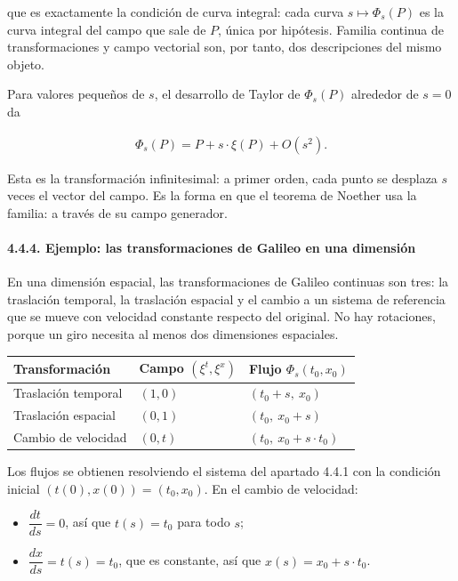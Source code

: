 \documentclass[
  spanish,
]{article}
\newcounter{none} %
\providecommand{\tightlist}{%
  \setlength{\itemsep}{0pt}\setlength{\parskip}{0pt}}
\begin{document}
que es exactamente la condición de curva integral: cada curva
\(s \mapsto \Phi_s(P)\) es la curva integral del campo que sale de
\(P\), única por hipótesis. Familia continua de transformaciones y campo
vectorial son, por tanto, dos descripciones del mismo objeto.

Para valores pequeños de \(s\), el desarrollo de Taylor de \(\Phi_s(P)\)
alrededor de \(s = 0\) da

\[
\begin{aligned}
\Phi_s(P) = P + s \cdot \xi(P) + O(s^2).
\end{aligned}
\]

Esta es la transformación infinitesimal: a primer orden, cada punto se
desplaza \(s\) veces el vector del campo. Es la forma en que el teorema
de Noether usa la familia: a través de su campo generador.

\paragraph{4.4.4. Ejemplo: las transformaciones de Galileo en una
dimensión}\label{ejemplo-las-transformaciones-de-galileo-en-una-dimensiuxf3n}

En una dimensión espacial, las transformaciones de Galileo continuas son
tres: la traslación temporal, la traslación espacial y el cambio a un
sistema de referencia que se mueve con velocidad constante respecto del
original. No hay rotaciones, porque un giro necesita al menos dos
dimensiones espaciales.

{\def\LTcaptype{none} %
\begin{longtable}[]{@{}lll@{}}
\toprule\noalign{}
Transformación & Campo \((\xi^t, \xi^x)\) & Flujo
\(\Phi_s(t_0, x_0)\) \\
\midrule\noalign{}
\endhead
\bottomrule\noalign{}
\endlastfoot
Traslación temporal & \((1, 0)\) & \((t_0 + s,\ x_0)\) \\
Traslación espacial & \((0, 1)\) & \((t_0,\ x_0 + s)\) \\
Cambio de velocidad & \((0, t)\) & \((t_0,\ x_0 + s \cdot t_0)\) \\
\end{longtable}
}

Los flujos se obtienen resolviendo el sistema del apartado 4.4.1 con la
condición inicial \((t(0), x(0)) = (t_0, x_0)\). En el cambio de
velocidad:

\begin{itemize}
\tightlist
\item
  \(\dfrac{dt}{ds} = 0\), así que \(t(s) = t_0\) para todo \(s\);
\item
  \(\dfrac{dx}{ds} = t(s) = t_0\), que es constante, así que
  \(x(s) = x_0 + s \cdot t_0\).
\end{itemize}
\end{document}
